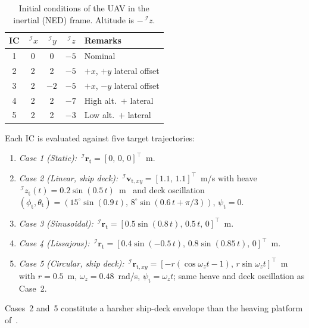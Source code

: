 \documentclass{IEEEtaes}
\theoremstyle{definition}
\theoremstyle{remark}
\begin{document}
\begin{table}[!t]
    \centering
    \caption{Initial conditions of the UAV in the inertial (NED) frame. Altitude is $-\,^\mathcal{I}z$.}
    \label{initial conditions: table}
    \begin{tabular}{ccccl}
    \toprule
        \textbf{IC} & $\,^\mathcal{I}x$ & $\,^\mathcal{I}y$ & $\,^\mathcal{I}z$ & \textbf{Remarks} \\
    \midrule
        1 & \phantom{-}0 & \phantom{-}0 & $-5$ & Nominal \\
        2 & \phantom{-}2 & \phantom{-}2 & $-5$ & $+x$, $+y$ lateral offset \\
        3 & \phantom{-}2 & $-2$         & $-5$ & $+x$, $-y$ lateral offset \\
        4 & \phantom{-}2 & \phantom{-}2 & $-7$ & High alt.\ $+$ lateral \\
        5 & \phantom{-}2 & \phantom{-}2 & $-3$ & Low alt.\ $+$ lateral \\
    \bottomrule
    \end{tabular}
\end{table}

Each IC is evaluated against five target trajectories:
\begin{enumerate}
    \item \textit{Case 1 (Static):}  $\,^\mathcal{I}\boldsymbol{r}_\text{t} = [0,\,0,\,0]^\top$~m.
    \item \textit{Case 2 (Linear, ship deck):} $\,^\mathcal{I}\boldsymbol{v}_{\text{t},xy} = [1.1,\,1.1]^\top$~m/s with heave $\,^\mathcal{I}z_\text{t}(t)=0.2\sin(0.5\,t)$~m~\cite{lin2022} and deck oscillation $(\phi_\text{t},\theta_\text{t})=(15^\circ\sin(0.9\,t),\,8^\circ\sin(0.6\,t+\pi/3))$, $\psi_\text{t}=0$.
    \item \textit{Case 3 (Sinusoidal):} $\,^\mathcal{I}\boldsymbol{r}_\text{t} = [0.5\sin(0.8\,t),\,0.5\,t,\,0]^\top$~m.
    \item \textit{Case 4 (Lissajous):} $\,^\mathcal{I}\boldsymbol{r}_\text{t} = [0.4\sin(-0.5\,t),\,0.8\sin(0.85\,t),\,0]^\top$~m.
    \item \textit{Case 5 (Circular, ship deck):} $\,^\mathcal{I}\boldsymbol{r}_{\text{t},xy} = [-r(\cos\omega_z t -1),\,r\sin\omega_z t]^\top$~m with $r=0.5$~m, $\omega_z = 0.48$~rad/s, $\psi_\text{t}=\omega_z t$; same heave and deck oscillation as Case~2.
\end{enumerate}
Cases~2 and~5 constitute a harsher ship-deck envelope than the heaving platform of~\cite{lin2022}.
\end{document}

